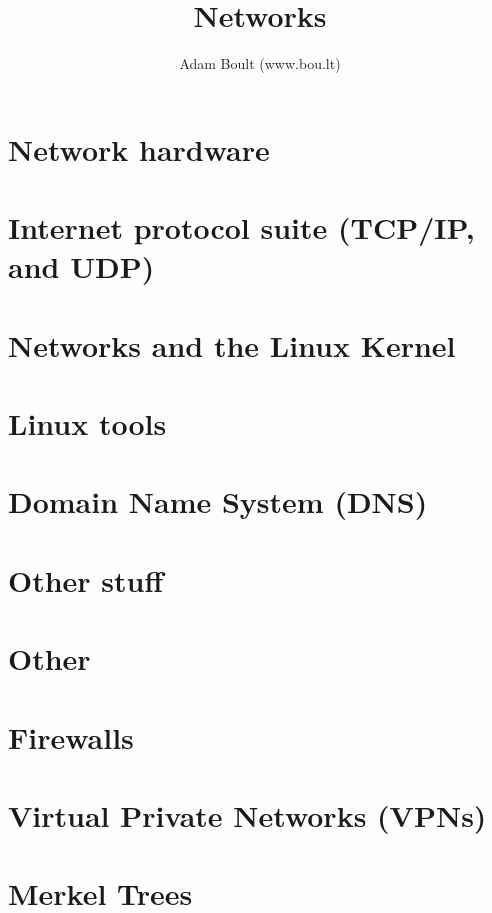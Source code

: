 \documentclass[oneside]{book}
\begin{document}
\author{Adam Boult (www.bou.lt)}
\title{Networks}
\maketitle

\setcounter{tocdepth}{0}
\tableofcontents



\part{Network hardware}

\part{Internet protocol suite (TCP/IP, and UDP)}


\part{Networks and the Linux Kernel}

\part{Linux tools}






\part{Domain Name System (DNS)}




\part{Other stuff}


\part{Other}






\part{Firewalls}


\part{Virtual Private Networks (VPNs)}


\part{Merkel Trees}

\end{document}
